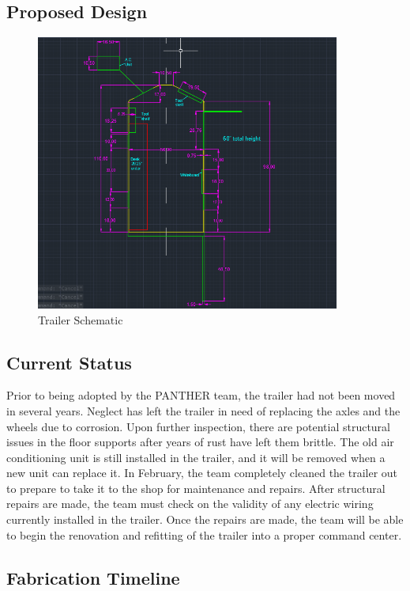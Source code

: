 \documentclass[12pt]{article}
\begin{document}
\subsection{Proposed Design}

\begin{figure}[h!]
    \centering
    \includegraphics[width=10cm]{images/02-2023/trailer/Trailer Schematic.png}
    \caption{Trailer Schematic}
    \label{fig:my_label}
\end{figure}

\subsection{Current Status}
Prior to being adopted by the PANTHER team, the trailer had not been moved in several years. Neglect has left the trailer in need of replacing the axles and the wheels due to corrosion. Upon further inspection, there are potential structural issues in the floor supports after years of rust have left them brittle. The old air conditioning unit is still installed in the trailer, and it will be removed when a new unit can replace it. In February, the team completely cleaned the trailer out to prepare to take it to the shop for maintenance and repairs. After structural repairs are made, the team must check on the validity of any electric wiring currently installed in the trailer. Once the repairs are made, the team will be able to begin the renovation and refitting of the trailer into a proper command center.  
\subsection{Fabrication Timeline}
\end{document}

